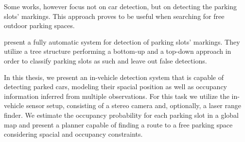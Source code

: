 Some works, however focus not on car detection, but on detecting the parking
slots' markings. This approach proves to be useful when searching for free
outdoor parking spaces.

\citet{suhr13} present a fully automatic system for detection of parking slots'
markings. They utilize a tree structure performing a bottom-up and a top-down
approach in order to classify parking slots as such and leave out false
detections.

In this thesis, we present an in-vehicle detection system that is capable of
detecting parked cars, modeling their spacial position as well as occupancy
information inferred from multiple observations. For this task we utilize the
in-vehicle sensor setup, consisting of a stereo camera and, optionally, a
laser range finder. We estimate the occupancy probability for each parking slot
in a global map and present a planner capable of finding a route to a free
parking space considering spacial and occupancy constraints.

